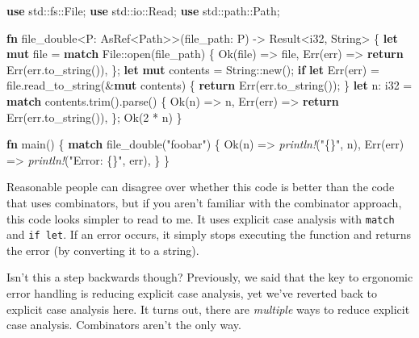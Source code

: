 \documentclass[a4paper,]{book}
\newenvironment{Shaded}{\begin{snugshade}}{\end{snugshade}}
\newcommand{\KeywordTok}[1]{\textcolor[rgb]{0.13,0.29,0.53}{\textbf{{#1}}}}
\newcommand{\DataTypeTok}[1]{\textcolor[rgb]{0.13,0.29,0.53}{{#1}}}
\newcommand{\DecValTok}[1]{\textcolor[rgb]{0.00,0.00,0.81}{{#1}}}
\newcommand{\ConstantTok}[1]{\textcolor[rgb]{0.00,0.00,0.00}{{#1}}}
\newcommand{\StringTok}[1]{\textcolor[rgb]{0.31,0.60,0.02}{{#1}}}
\newcommand{\PreprocessorTok}[1]{\textcolor[rgb]{0.56,0.35,0.01}{\textit{{#1}}}}
\newcommand{\NormalTok}[1]{{#1}}
\begin{document}
\begin{Shaded}
\begin{Highlighting}[]
\KeywordTok{use} \NormalTok{std::fs::File;}
\KeywordTok{use} \NormalTok{std::io::Read;}
\KeywordTok{use} \NormalTok{std::path::Path;}

\KeywordTok{fn} \NormalTok{file_double<P: AsRef<Path>>(file_path: P) -> }\DataTypeTok{Result}\NormalTok{<}\DataTypeTok{i32}\NormalTok{, }\DataTypeTok{String}\NormalTok{> \{}
    \KeywordTok{let} \KeywordTok{mut} \NormalTok{file = }\KeywordTok{match} \NormalTok{File::open(file_path) \{}
        \ConstantTok{Ok}\NormalTok{(file) => file,}
        \ConstantTok{Err}\NormalTok{(err) => }\KeywordTok{return} \ConstantTok{Err}\NormalTok{(err.to_string()),}
    \NormalTok{\};}
    \KeywordTok{let} \KeywordTok{mut} \NormalTok{contents = }\DataTypeTok{String}\NormalTok{::new();}
    \KeywordTok{if} \KeywordTok{let} \ConstantTok{Err}\NormalTok{(err) = file.read_to_string(&}\KeywordTok{mut} \NormalTok{contents) \{}
        \KeywordTok{return} \ConstantTok{Err}\NormalTok{(err.to_string());}
    \NormalTok{\}}
    \KeywordTok{let} \NormalTok{n: }\DataTypeTok{i32} \NormalTok{= }\KeywordTok{match} \NormalTok{contents.trim().parse() \{}
        \ConstantTok{Ok}\NormalTok{(n) => n,}
        \ConstantTok{Err}\NormalTok{(err) => }\KeywordTok{return} \ConstantTok{Err}\NormalTok{(err.to_string()),}
    \NormalTok{\};}
    \ConstantTok{Ok}\NormalTok{(}\DecValTok{2} \NormalTok{* n)}
\NormalTok{\}}

\KeywordTok{fn} \NormalTok{main() \{}
    \KeywordTok{match} \NormalTok{file_double(}\StringTok{"foobar"}\NormalTok{) \{}
        \ConstantTok{Ok}\NormalTok{(n) => }\PreprocessorTok{println!}\NormalTok{(}\StringTok{"\{\}"}\NormalTok{, n),}
        \ConstantTok{Err}\NormalTok{(err) => }\PreprocessorTok{println!}\NormalTok{(}\StringTok{"Error: \{\}"}\NormalTok{, err),}
    \NormalTok{\}}
\NormalTok{\}}
\end{Highlighting}
\end{Shaded}

Reasonable people can disagree over whether this code is better than the
code that uses combinators, but if you aren't familiar with the
combinator approach, this code looks simpler to read to me. It uses
explicit case analysis with \texttt{match} and \texttt{if\ let}. If an
error occurs, it simply stops executing the function and returns the
error (by converting it to a string).

Isn't this a step backwards though? Previously, we said that the key to
ergonomic error handling is reducing explicit case analysis, yet we've
reverted back to explicit case analysis here. It turns out, there are
\emph{multiple} ways to reduce explicit case analysis. Combinators
aren't the only way.
\end{document}
